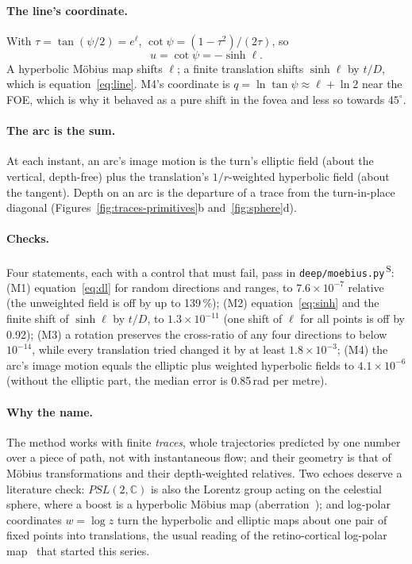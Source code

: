 \documentclass[11pt,a4paper]{article}
\newcommand{\code}[1]{\texttt{\small #1}}
\newcommand{\src}[1]{\textsuperscript{\,#1}}
\newcommand{\SB}{\src{S}}   %
\begin{document}
\paragraph{The line's coordinate.} With $\tau=\tan(\psi/2)=e^{\ell}$, $\cot\psi=(1-\tau^2)/(2\tau)$, so
\begin{equation}\label{eq:sinh}
  u=\cot\psi=-\sinh\ell .
\end{equation}
A hyperbolic M\"obius map shifts $\ell$; a finite translation shifts $\sinh\ell$ by $t/D$, which is
equation~\eqref{eq:line}. M4's coordinate is $q=\ln\tan\psi\approx\ell+\ln2$ near the FOE, which is why it behaved as a
pure shift in the fovea and less so towards $45^\circ$.

\paragraph{The arc is the sum.} At each instant, an arc's image motion is the turn's elliptic field (about the vertical,
depth-free) plus the translation's $1/r$-weighted hyperbolic field (about the tangent). Depth on an arc is the
departure of a trace from the turn-in-place diagonal (Figures~\ref{fig:traces-primitives}b and~\ref{fig:sphere}d).

\paragraph{Checks.} Four statements, each with a control that must fail, pass in \code{deep/moebius.py}\SB: (M1)
equation~\eqref{eq:dl} for random directions and ranges, to $7.6\times10^{-7}$ relative (the unweighted field is off by up
to 139\,\%); (M2) equation~\eqref{eq:sinh} and the finite shift of $\sinh\ell$ by $t/D$, to $1.3\times10^{-11}$ (one shift
of $\ell$ for all points is off by 0.92); (M3) a rotation preserves the cross-ratio of any four directions to below
$10^{-14}$, while every translation tried changed it by at least $1.8\times10^{-3}$; (M4) the arc's image motion equals the
elliptic plus weighted hyperbolic fields to $4.1\times10^{-6}$ (without the elliptic part, the median error is 0.85\,rad per
metre).

\paragraph{Why the name.} The method works with finite \emph{traces}, whole trajectories predicted by one number over a
piece of path, not with instantaneous flow; and their geometry is that of M\"obius transformations and their
depth-weighted relatives. Two echoes deserve a literature check: $PSL(2,\mathbb C)$ is also the Lorentz group acting on the
celestial sphere, where a boost is a hyperbolic M\"obius map (aberration~\cite{penrose}); and log-polar coordinates
$w=\log z$ turn the hyperbolic and elliptic maps about one pair of fixed points into translations, the usual reading of
the retino-cortical log-polar map~\cite{schwartz} that started this series.
\end{document}
